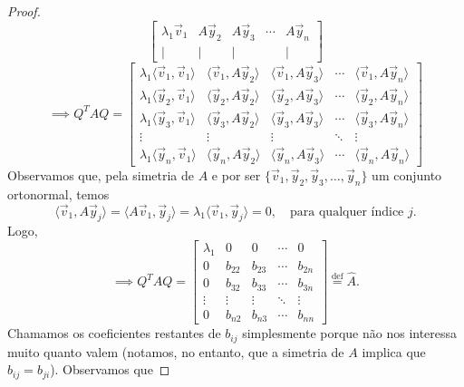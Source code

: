 \begin{proof}
\begin{equation}
\begin{bmatrix}
	\lambda_1 \vec{v}_1 & A \vec{y}_2 & A \vec{y}_3 & \cdots &  A\vec{y}_n \\
	| & | & | & & |
	\end{bmatrix}
	\end{equation}
	\begin{equation}
	\implies Q^TAQ =
	\begin{bmatrix}
	\lambda_1\langle \vec{v}_1, \vec{v}_1 \rangle & \langle \vec{v}_1, A\vec{y}_2 \rangle & \langle \vec{v}_1, A\vec{y}_3 \rangle & \cdots & \langle \vec{v}_1, A\vec{y}_n \rangle \\
	\lambda_1\langle \vec{y}_2, \vec{v}_1 \rangle & \langle \vec{y}_2, A\vec{y}_2 \rangle & \langle \vec{y}_2, A\vec{y}_3 \rangle & \cdots & \langle \vec{y}_2, A\vec{y}_n \rangle \\
	\lambda_1\langle \vec{y}_3, \vec{v}_1 \rangle & \langle \vec{y}_3, A\vec{y}_2 \rangle & \langle \vec{y}_3, A\vec{y}_3 \rangle & \cdots & \langle \vec{y}_3, A\vec{y}_n \rangle \\
	\vdots & \vdots & \vdots & \ddots & \vdots \\
	\lambda_1\langle \vec{y}_n, \vec{v}_1 \rangle & \langle \vec{y}_n, A\vec{y}_2 \rangle & \langle \vec{y}_n, A\vec{y}_3 \rangle & \cdots & \langle \vec{y}_n, A\vec{y}_n \rangle
	\end{bmatrix}
	\end{equation} Observamos que, pela simetria de $A$ e por ser $	\{ \vec{v}_1, \vec{y}_2, \vec{y}_3, \dots, \vec{y}_n \}$ um conjunto ortonormal, temos
	\begin{equation}
	\langle \vec{v}_1, A\vec{y}_j \rangle = \langle A\vec{v}_1, \vec{y}_j \rangle = \lambda_1 \langle \vec{v}_1, \vec{y}_j \rangle = 0, \quad \text{para qualquer índice } j.
	\end{equation}Logo,
	\begin{equation}
	\implies Q^TAQ =
	\begin{bmatrix}
	\lambda_1 & 0 & 0 & \cdots & 0 \\
	0 & b_{22} & b_{23} & \cdots & b_{2n} \\
	0 & b_{32} & b_{33} & \cdots & b_{3n} \\
	\vdots & \vdots & \vdots & \ddots & \vdots \\
	0 & b_{n2} & b_{n3} & \cdots & b_{nn}
	\end{bmatrix} \stackrel{\text{def}}{=} \hat{A}.
	\end{equation} Chamamos os coeficientes restantes de $b_{ij}$ simplesmente porque não nos interessa muito quanto valem (notamos, no entanto, que a simetria de $A$ implica que $b_{ij} = b_{ji}$). Observamos que

\end{proof}
